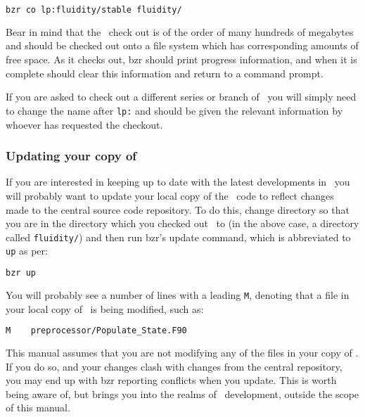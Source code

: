 \begin{lstlisting}[language=Bash]
bzr co lp:fluidity/stable fluidity/
\end{lstlisting}

Bear in mind that the \fluidity\ check out is of the order of many hundreds of
megabytes and should be checked out onto a file system which has corresponding
amounts of free space. As it checks out, bzr should print progress information,
and when it is complete should clear this information and return to a command
prompt.

If you are asked to check out a different series or branch of \fluidity\ you
will simply need to change the name after \lstinline[language=Bash]+lp:+ and
should be given the relevant information by whoever has requested the checkout.

\subsubsection{Updating your copy of \fluidity}
\label{sec:subversion_updating}

If you are interested in keeping up to date with the latest developments in
\fluidity\ you will probably want to update your local copy of the \fluidity\
code to reflect changes made to the central source code repository. To do this,
change directory so that you are in the directory which you checked out
\fluidity\ to (in the above case, a directory called
\lstinline[language=Bash]+fluidity/+) and then run bzr's update command, which
is abbreviated to \lstinline[language=Bash]+up+ as per:

\begin{lstlisting}[language=Bash]
bzr up
\end{lstlisting}

You will probably see a number of lines with a leading
\lstinline[language=Bash]+M+, denoting that a file in your local copy of
\fluidity\ is being modified, such as:

\begin{lstlisting}[language=Bash]
M    preprocessor/Populate_State.F90
\end{lstlisting}

This manual assumes that you are not modifying any of the files in your copy of
\fluidity. If you do so, and your changes clash with changes from the central
repository, you may end up with bzr reporting conflicts when you update. This
is worth being aware of, but brings you into the realms of \fluidity\
development, outside the scope of this manual.

